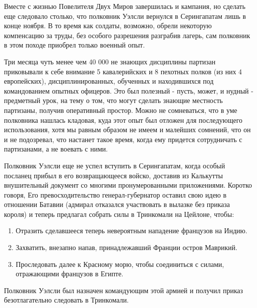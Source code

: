 \documentclass[
  oneside,
  12pt,
  titlepage]{book}
\begin{document}
Вместе с жизнью Повелителя Двух Миров завершилась и кампания, но сделать еще следовало столько, что полковник Уэлсли вернулся в Серингапатам лишь в конце ноября. В то время как солдаты, возможно, обрели некоторую компенсацию за труды, без особого разрешения разграбив лагерь, сам полковник в этом походе приобрел только военный опыт.

Три месяца чуть менее чем 40 000 не знающих дисциплины партизан приковывали к себе внимание 5 кавалерийских и 8 пехотных полков (из них 4 европейских), дисциплинированных, обученных и находившихся под командованием опытных офицеров. Это был полезный - пусть, может, и нудный - предметный урок, на тему о том, что могут сделать знающие местность партизаны, получив оперативный простор. Можно не сомневаться, что в уме полковника нашлась кладовая, куда этот опыт был отложен для последующего использования, хотя мы равным образом не имеем и малейших сомнений, что он и не подозревал, что настанет такое время, когда ему придется сотрудничать с партизанами, а не воевать с ними.

Полковник Уэлсли еще не успел вступить в Серингапатам, когда особый посланец прибыл в его возвращающееся войско, доставив из Калькутты внушительный документ со многими пронумерованными приложениями. Коротко говоря, Его превосходительство генерал-губернатор оставил свою идею в отношении Батавии (адмирал отказался участвовать в вылазке без приказа короля) и теперь предлагал собрать силы в Тринкомали на Цейлоне, чтобы:

\begin{enumerate}
\def\labelenumi{\arabic{enumi}.}
\item
  Отразить сделавшееся теперь невероятным нападение французов на Индию.
\item
  Захватить, внезапно напав, принадлежавший Франции остров Маврикий.
\item
  Проследовать далее к Красному морю, чтобы соединиться с силами, отражающими французов в Египте.
\end{enumerate}

Полковник Уэлсли был назначен командующим этой армией и получил приказ безотлагательно следовать в Тринкомали.
\end{document}
